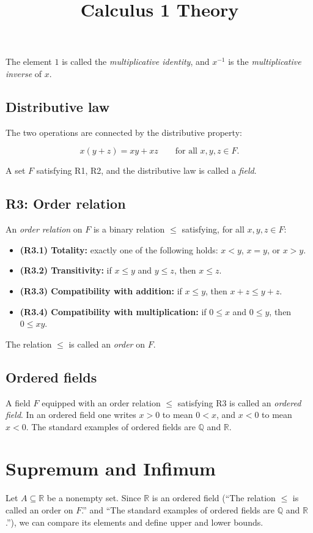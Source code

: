 \documentclass[11pt,a4paper]{article} \usepackage[T1]{fontenc}
\theoremstyle{plain} \newtheorem{theorem}{Theorem} \title{Calculus 1 Theory}
\begin{document}
The element $1$ is called the \emph{multiplicative identity}, and $x^{-1}$ is
the \emph{multiplicative inverse} of $x$.

\subsection*{Distributive law}

The two operations are connected by the distributive property:

\[
x(y+z) = xy + xz \qquad \text{for all } x,y,z\in F.
\]

A set $F$ satisfying R1, R2, and the distributive law is called a \emph{field}.

\subsection*{R3: Order relation}

An \emph{order relation} on $F$ is a binary relation $\le$ satisfying, for all
$x,y,z\in F$:

\begin{itemize}
\item \textbf{(R3.1) Totality:} exactly one of the following holds: $x<y$,
$x=y$, or $x>y$.
\item \textbf{(R3.2) Transitivity:} if $x\le y$ and $y\le z$, then $x\le z$.
\item \textbf{(R3.3) Compatibility with addition:} if $x\le y$, then $x+z \le
y+z$.
\item \textbf{(R3.4) Compatibility with multiplication:} if $0\le x$ and $0\le
y$, then $0\le xy$.
\end{itemize}

The relation $\le$ is called an \emph{order} on $F$.

\subsection*{Ordered fields}

A field $F$ equipped with an order relation $\le$ satisfying R3 is called an
\emph{ordered field}. In an ordered field one writes $x>0$ to mean $0<x$, and
$x<0$ to mean $x<0$. The standard examples of ordered fields are $\mathbb{Q}$
and $\mathbb{R}$.

\section{Supremum and Infimum}

Let $A\subseteq\mathbb{R}$ be a nonempty set. Since $\mathbb{R}$ is an ordered
field (“The relation $\le$ is called an order on $F$.” and “The standard
examples of ordered fields are $\mathbb{Q}$ and $\mathbb{R}$.”), we can compare
its elements and define upper and lower bounds.
\end{document}
